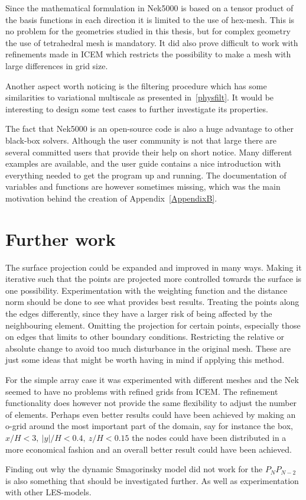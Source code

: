 Since the mathematical formulation in Nek5000 is based on a tensor product of the basis functions 
in each direction it is limited to the use of hex-mesh. This is no problem for the geometries 
studied in this thesis, but for complex geometry the use of tetrahedral mesh is mandatory.
It did also prove difficult to work with refinements made in ICEM which restricts the possibility 
to make a mesh with large differences in grid size.

Another aspect worth noticing is the filtering procedure which has some similarities to variational multiscale
as presented in~\cref{physfilt}. It would be interesting to design some test cases to further 
investigate its properties. 

The fact that Nek5000 is an open-source code is also a huge advantage to other black-box solvers. 
Although the user community is not that large there are several committed users that provide 
their help on short notice. Many different examples are available, and the user guide 
contains a nice introduction with everything needed to get the program up and running. 
The documentation of variables and functions are however sometimes missing, which was 
the main motivation behind the creation of Appendix~\ref{AppendixB}. 


\section{Further work}
The surface projection could be expanded and improved in many ways. Making it iterative 
such that the points are projected more controlled towards the surface is one possibility. 
Experimentation with the weighting function and the distance norm should be done to see 
what provides best results. Treating the points along the edges differently, since they 
have a larger risk of being affected by the neighbouring element. Omitting the projection 
for certain points, especially those on edges that limits to other boundary conditions.
Restricting the relative or absolute change to avoid too much disturbance in the original mesh. 
These are just some ideas that might be worth having in mind if applying this method.

For the simple array case it was experimented with different meshes and the Nek seemed to 
have no problems with refined grids from ICEM. The refinement functionality does however not 
provide the same flexibility to adjust the number of elements. Perhaps even better results could 
have been achieved by making an o-grid around the most important part of the domain,
say for instance the box, $x/H < 3,\: |y|/H < 0.4,\: z/H < 0.15$ the nodes could have been 
distributed in a more economical fashion and an overall better result could have been achieved.

Finding out why the dynamic Smagorinsky model did not work for the $P_NP_{N-2}$ is also 
something that should be investigated further. As well as experimentation with 
other LES-models. 
